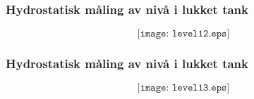 \documentclass[aspectratio=169,xcolor=dvipsnames]{beamer}
\begin{document}
%
%
%
%
%
%
%
%
\begin{frame}
	\frametitle{Hydrostatisk måling av nivå i lukket tank}

	$$\texttt{[image: level12.eps]}$$
\end{frame}
%
%
%
%
\begin{frame}
	\frametitle{Hydrostatisk måling av nivå i lukket tank}

	$$\texttt{[image: level13.eps]}$$
\end{frame}
%
%
\end{document}
